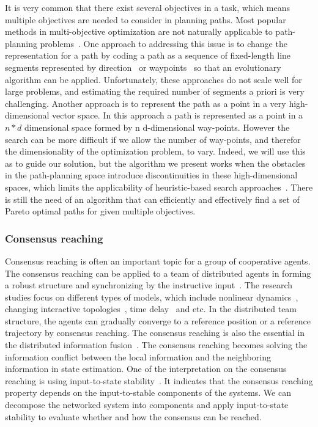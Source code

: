 \documentclass[phd]{byuprop}
\begin{document}
It is very common that there exist several objectives in a task, which means multiple objectives are needed to consider in planning paths.
Most popular methods in multi-objective optimization are not naturally applicable to path-planning problems~\cite{Zhang2007,Deb2014}.
One approach to addressing this issue is to change the representation for a path by coding a path as a sequence of fixed-length line segments represented by direction~\cite{Ahmed2013,Howlett2006} or waypoints~\cite{Sujit2009,Pires2004} so that an evolutionary algorithm can be applied. 
Unfortunately, these approaches do not scale well for large problems, and estimating the required number of segments a priori is very challenging. 
Another approach is to represent the path as a point in a very high-dimensional vector space.
In this approach a path is represented as a point in a $ n * d $ dimensional space formed by n d-dimensional way-points.
However the search can be more difficult if we allow the number of way-points, and therefor the dimensionality of the optimization problem, to vary. 
Indeed, we will use this as to guide our solution, but the algorithm we present works when the obstacles in the path-planning space introduce discontinuities in these high-dimensional spaces, which limits the applicability of heuristic-based search approaches~\cite{Sujit2009,Zhang2007}.
There is still the need of an algorithm that can efficiently and effectively find a set of Pareto optimal paths for given multiple objectives.

\subsubsection{Consensus reaching}

Consensus reaching is often an important topic for a group of cooperative agents.
The consensus reaching can be applied to a team of distributed agents in forming a robust structure and synchronizing by the instructive input~\cite{1431045,5990997,5229134,1333204}.
The research studies focus on different types of models, which include nonlinear dynamics~\cite{5229134}, changing interactive topologies~\cite{1431045}, time delay~\cite{1333204} and etc.
In the distributed team structure, the agents can gradually converge to a reference position or a reference trajectory by consensus reaching.
The consensus reaching is also the essential in the distributed information fusion~\cite{1470210,1470240,sharma2010distributed}.
The consensus reaching becomes solving the information conflict between the local information and the neighboring information in state estimation.
One of the interpretation on the consensus reaching is using input-to-state stability~\cite{1470210}.
It indicates that the consensus reaching property depends on the input-to-stable components of the systems.
We can decompose the networked system into components and apply input-to-state stability to evaluate whether and how the consensus can be reached. 
\end{document}
